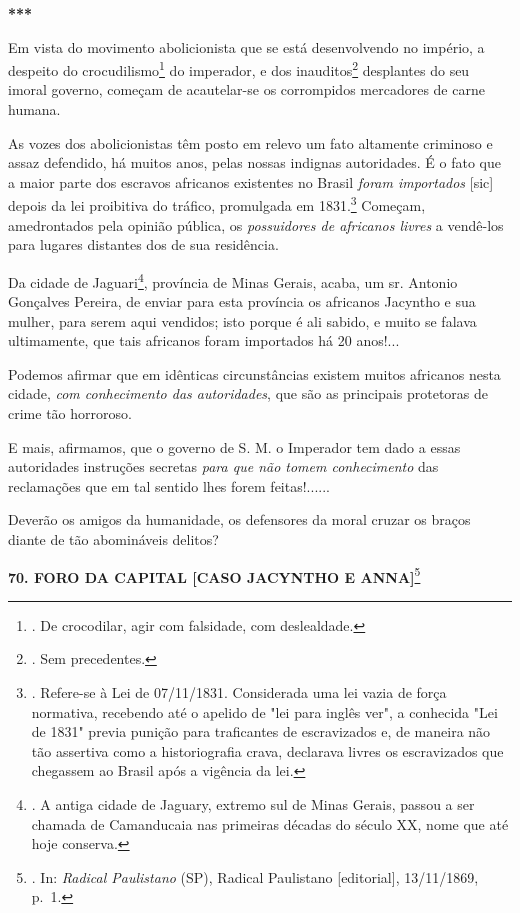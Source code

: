\textbf{***}

Em vista do movimento abolicionista que se está desenvolvendo no
império, a despeito do crocudilismo\footnote{. De crocodilar, agir com
  falsidade, com deslealdade.} do imperador, e dos inauditos\footnote{.
  Sem precedentes.} desplantes do seu imoral governo, começam de
acautelar-se os corrompidos mercadores de carne humana.

As vozes dos abolicionistas têm posto em relevo um fato altamente
criminoso e assaz defendido, há muitos anos, pelas nossas indignas
autoridades. É o fato que a maior parte dos escravos africanos
existentes no Brasil \emph{foram importados} {[}sic{]} depois da lei
proibitiva do tráfico, promulgada em 1831.\footnote{. Refere-se à Lei de
  07/11/1831. Considerada uma lei vazia de força normativa, recebendo
  até o apelido de "lei para inglês ver", a conhecida "Lei de 1831"
  previa punição para traficantes de escravizados e, de maneira não tão
  assertiva como a historiografia crava, declarava livres os
  escravizados que chegassem ao Brasil após a vigência da lei.} Começam,
amedrontados pela opinião pública, os \emph{possuidores de africanos
livres} a vendê-los para lugares distantes dos de sua residência.

Da cidade de Jaguari\footnote{. A antiga cidade de Jaguary, extremo sul
  de Minas Gerais, passou a ser chamada de Camanducaia nas primeiras
  décadas do século XX, nome que até hoje conserva.}, província de Minas
Gerais, acaba, um sr. Antonio Gonçalves Pereira, de enviar para esta
província os africanos Jacyntho e sua mulher, para serem aqui vendidos;
isto porque é ali sabido, e muito se falava ultimamente, que tais
africanos foram importados há 20 anos!...

Podemos afirmar que em idênticas circunstâncias existem muitos africanos
nesta cidade, \emph{com conhecimento das autoridades}, que são as
principais protetoras de crime tão horroroso.

E mais, afirmamos, que o governo de S. M. o Imperador tem dado a essas
autoridades instruções secretas \emph{para que não tomem conhecimento}
das reclamações que em tal sentido lhes forem feitas!......

Deverão os amigos da humanidade, os defensores da moral cruzar os braços
diante de tão abomináveis delitos?

\textbf{70. FORO DA CAPITAL {[}CASO JACYNTHO E ANNA{]}}\footnote{. In:
  \emph{Radical Paulistano} (SP), Radical Paulistano {[}editorial{]},
  13/11/1869, p.~1.}


